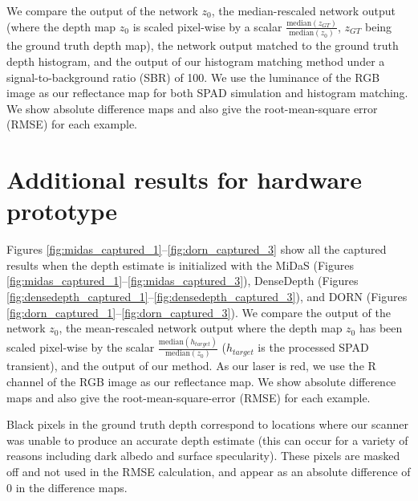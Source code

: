 \documentclass[runningheads]{llncs}
\begin{document}
We compare the output of the network $z_0$, the
median-rescaled network output (where the depth map $z_0$ is scaled pixel-wise by a
scalar $\frac{\text{median}(z_{GT})}{\text{median}(z_0)}$, $z_{GT}$ being the
ground truth depth map), the network output matched to the ground truth depth histogram, and the output of
our histogram matching method under a signal-to-background ratio (SBR) of 100.
We use the luminance of the RGB image as our reflectance map
for both SPAD simulation and histogram matching.
We show absolute difference maps and also give
the root-mean-square error (RMSE) for each example.
% 

\section{Additional results for hardware prototype}
Figures \ref{fig:midas_captured_1}--\ref{fig:dorn_captured_3} show all the
captured results when the depth estimate is initialized with the MiDaS
\cite{Lasinger:2019} (Figures \ref{fig:midas_captured_1}--\ref{fig:midas_captured_3}),
DenseDepth (Figures \ref{fig:densedepth_captured_1}--\ref{fig:densedepth_captured_3}),
and DORN (Figures \ref{fig:dorn_captured_1}--\ref{fig:dorn_captured_3}). We compare
the output of the network $z_0$, the mean-rescaled network output where the
depth map $z_0$ has been scaled pixel-wise by the scalar
$\frac{\text{median}(h_{target})}{\text{median}(z_0)}$ ($h_{target}$ is the
processed SPAD transient), and the output of our method. As our laser is red, we
use the R channel of the RGB image as our reflectance map. We show absolute
difference maps and also give the root-mean-square-error (RMSE) for each
example.

Black pixels in the ground truth depth correspond to locations where our scanner
was unable to produce an accurate depth estimate (this can occur for a variety
of reasons including dark albedo and surface specularity). These pixels are masked off and not used in the RMSE
calculation, and appear as an absolute difference of 0 in the difference maps.
% 

\clearpage 

{\small


}
\end{document}
